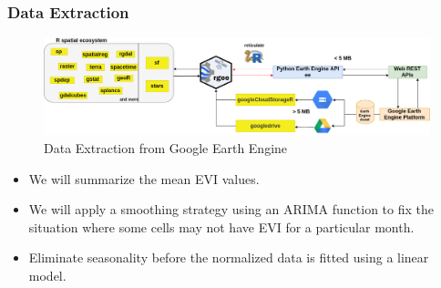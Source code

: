 \documentclass[11pt]{beamer}
\begin{document}
\begin{frame}
	\frametitle{Data Extraction}
	\begin{figure}
		\centering
		\includegraphics[width=0.7\linewidth]{images/DataExtraction}
		\caption{Data Extraction from Google Earth Engine}
		\label{fig:dataextraction}
	\end{figure}
	\begin{itemize}
			\item We will summarize the mean EVI values.
			\item We will apply a smoothing strategy using an ARIMA function to fix the situation where some cells may not have EVI for a particular month. 
			\item Eliminate seasonality before the normalized data is fitted using a linear model.
	\end{itemize}
\end{frame}
\end{document}
